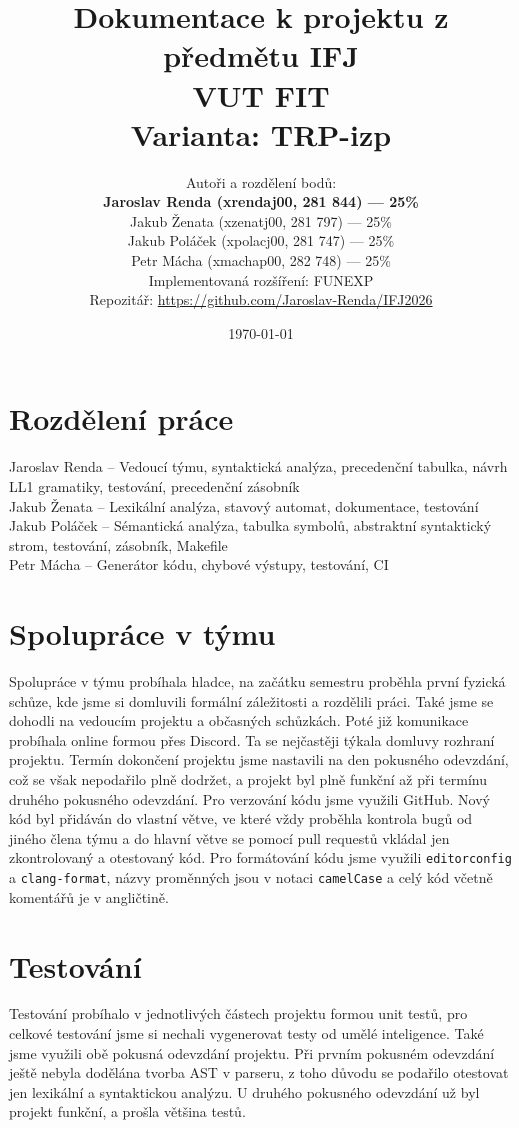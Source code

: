 \documentclass[12pt, a4paper]{article}
\title{Dokumentace k projektu z předmětu IFJ \\[0.7em] \large VUT FIT \\[0.4em]
\normalsize Varianta: TRP-izp}
\author{Autoři a rozdělení bodů:\\[0.5em]
\textbf{Jaroslav Renda (xrendaj00, 281 844) --- 25\%}\\
Jakub Ženata (xzenatj00, 281 797) --- 25\%\\
Jakub Poláček (xpolacj00, 281 747) --- 25\%\\
Petr Mácha (xmachap00, 282 748) --- 25\%\\[1em]
Implementovaná rozšíření: FUNEXP\\
Repozitář: \url{https://github.com/Jaroslav-Renda/IFJ2026}}
\date{\today}
\begin{document}
\maketitle

\newpage
\tableofcontents 


\newpage
\section{Rozdělení práce}

Jaroslav Renda -- Vedoucí týmu, syntaktická analýza, precedenční tabulka, návrh LL1 gramatiky, testování, precedenční zásobník
\\Jakub Ženata -- Lexikální analýza, stavový automat, dokumentace, testování
\\Jakub Poláček -- Sémantická analýza, tabulka symbolů, abstraktní syntaktický strom, testování, zásobník, Makefile
\\ Petr Mácha -- Generátor kódu, chybové výstupy, testování, CI


\section{Spolupráce v týmu} 
Spolupráce v týmu probíhala hladce, na začátku semestru proběhla první fyzická schůze, kde jsme si domluvili formální záležitosti a rozdělili práci.
Také jsme se dohodli na vedoucím projektu a občasných schůzkách. Poté již komunikace probíhala online formou přes Discord. Ta se nejčastěji týkala domluvy rozhraní projektu. Termín dokončení projektu jsme nastavili na den pokusného odevzdání, což se však nepodařilo plně dodržet, a projekt byl plně funkční až při termínu druhého pokusného odevzdání. 
Pro verzování kódu jsme využili GitHub. Nový kód byl přidáván do vlastní větve, ve které vždy proběhla kontrola bugů od jiného člena týmu a do hlavní větve se pomocí pull requestů vkládal jen zkontrolovaný a otestovaný kód.
Pro formátování kódu jsme využili \texttt{editorconfig} a \texttt{clang-format}, názvy proměnných jsou v notaci \texttt{camelCase} a celý kód včetně komentářů je v angličtině.

\section{Testování} 
Testování probíhalo v jednotlivých částech projektu formou unit testů, pro celkové testování jsme si nechali vygenerovat testy od umělé inteligence. Také jsme využili obě pokusná odevzdání projektu.
Při prvním pokusném odevzdání ještě nebyla dodělána tvorba AST v parseru, z toho důvodu se podařilo otestovat jen lexikální a syntaktickou analýzu. U druhého pokusného odevzdání už byl projekt funkční, a prošla většina testů.
\newpage
\end{document}
